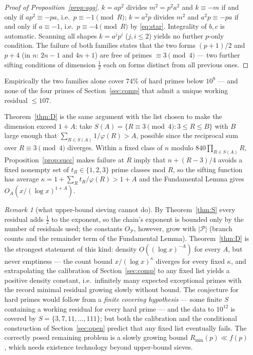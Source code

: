 \documentclass[11pt]{article}
\theoremstyle{plain}
\theoremstyle{remark}
\newtheorem{remark}[theorem]{Remark}
\theoremstyle{plain}
\numberwithin{equation}{section}
\begin{document}
\begin{proof}[Proof of Proposition~\ref{prop:agg}]
$k = a p^2$ divides $m^2 = p^2 a^2$ and $k \equiv -m$ if and only if
$a p^2 \equiv -p a$, i.e.\ $p \equiv -1 \pmod R$; $k = a^2 p$ divides
$m^2$ and $a^2 p \equiv -p a$ if and only if $a \equiv -1$, i.e.\
$p \equiv -4 \pmod R$ by \eqref{eq:star}. Integrality of $b, c$ is
automatic. Scanning all shapes $k = a^j p^i$ ($j, i \le 2$) yields no
further $p$-only condition. The failure of both families states that the
two forms $(p+1)/2$ and $p+4$ (in $n$: $2n-1$ and $4n+1$) are free of
primes $\equiv 3 \pmod 4$ --- two further sifting conditions of
dimension $\tfrac12$ each on forms distinct from all previous ones.
\end{proof}

Empirically the two families alone cover $74\%$ of hard primes below
$10^9$ --- and none of the four primes of Section~\ref{sec:comp} that
admit a unique working residual $\le 107$.

Theorem~\ref{thm:D} is the same argument with the list chosen to make
the dimension exceed $1 + A$: take
$S(A) = \{R \equiv 3 \pmod 4 : 3 \le R \le B\}$ with $B$ large enough
that $\sum_{R \in S(A)} 1/\varphi(R) > A$, possible since the
reciprocal sum over $R \equiv 3 \pmod 4$ diverges. Within a fixed
class of $n$ modulo $840\prod_{R \in S(A)} R$,
Proposition~\ref{prop:succ} makes failure at $R$ imply that
$n + (R-3)/4$ avoids a fixed nonempty set of $t_R \in \{1,2,3\}$
prime classes mod $R$, so the sifting function has average
$\kappa = 1 + \sum_R t_R/\varphi(R) > 1 + A$ and the Fundamental Lemma
gives $O_A(x/(\log x)^{1+A})$.

\begin{remark}[what upper-bound sieving cannot do]\label{rem:emptiness}
By Theorem~\ref{thm:S} every residual adds $\tfrac12$ to the exponent,
so the chain's exponent is bounded only by the number of residuals
used; the constants $O_{\mathcal{P}}$, however, grow with
$|\mathcal{P}|$ (branch counts and the remainder term of the
Fundamental Lemma). Theorem~\ref{thm:D} is the strongest statement of
this kind: density $O((\log x)^{-A})$ for every $A$, but never
emptiness --- the count bound $x/(\log x)^{\kappa}$ diverges for every
fixed $\kappa$, and extrapolating the calibration of
Section~\ref{sec:comp} to any fixed list yields a positive density
constant, i.e.\ infinitely many expected exceptional primes with the
record minimal residual growing slowly without bound. The conjecture
for hard primes would follow from a \emph{finite covering hypothesis}
--- some finite $S$ containing a working residual for every hard prime
--- and the data to $10^{12}$ is covered by
$S = \{3, 7, 11, \dots, 111\}$; but both the calibration and the
conditional construction of Section~\ref{sec:open} predict that any
fixed list eventually fails. The correctly posed remaining problem is
a slowly growing bound $R_{\min}(p) \ll f(p)$, which needs existence
technology beyond upper-bound sieves.
\end{remark}
\end{document}
